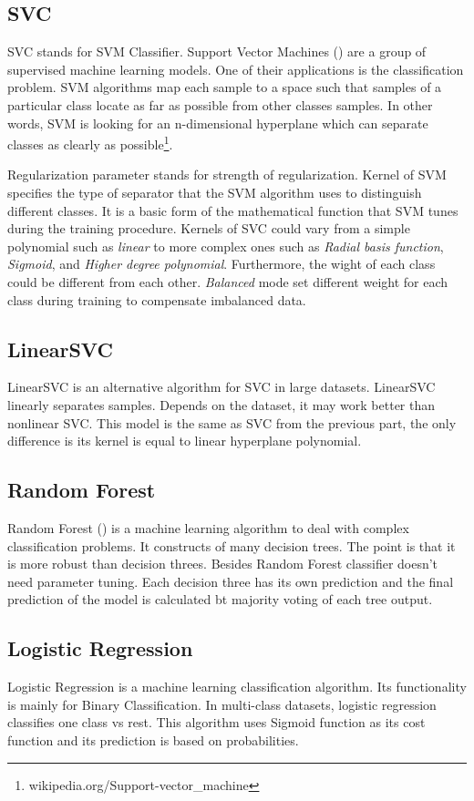 \subsection{SVC}
\label{SVM}
SVC stands for SVM Classifier. Support Vector Machines (\cite{svc})  are a group of supervised machine learning models. One of their applications is the classification problem. SVM algorithms map each sample to a space such that samples of a particular class locate as far as possible from other classes samples. In other words, SVM is looking for an n-dimensional hyperplane which can separate classes as clearly as possible\footnote{wikipedia.org/Support-vector\_machine}.

Regularization parameter stands for strength of regularization. Kernel of SVM specifies the type of separator that the SVM algorithm uses to distinguish different classes. It is a basic form of the mathematical function that SVM tunes during the training procedure. Kernels of SVC could vary from a simple polynomial such as \textit{linear} to more complex ones such as \textit{Radial basis function}, \textit{Sigmoid}, and \textit{Higher degree polynomial}. Furthermore, the wight of each class could be different from each other. \textit{Balanced} mode set different weight for each class during training to compensate imbalanced data. 


\subsection{LinearSVC}
LinearSVC is an alternative algorithm for SVC in large datasets. LinearSVC linearly separates samples. Depends on the dataset, it may work better than nonlinear SVC. This model is the same as SVC from the previous part, the only difference is its kernel is equal to linear hyperplane polynomial. 

\subsection{Random Forest}
Random Forest (\cite{randomforest}) is a machine learning algorithm to deal with complex classification problems. It constructs of many decision trees. The point is that it is more robust than decision threes. Besides Random Forest classifier doesn't need parameter tuning. Each decision three has its own prediction and the final prediction of the model is calculated bt majority voting of each tree output. 

\subsection{Logistic Regression}
Logistic Regression is a machine learning classification algorithm. Its functionality is mainly for Binary Classification. In multi-class datasets, logistic regression classifies one class vs rest. This algorithm uses Sigmoid function as its cost function and its prediction is based on probabilities. 

